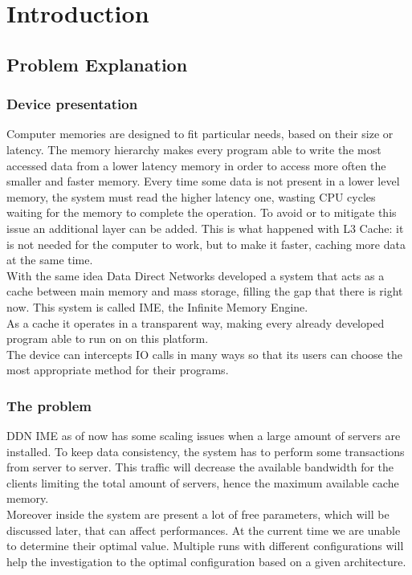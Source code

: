 \chapter{Introduction}

\section{Problem Explanation}
\subsection{Device presentation}
Computer memories are designed to fit particular needs, based on their size or
latency. The memory hierarchy makes every program able to write the most accessed
data from a lower latency memory in order to access more often the smaller and
faster memory. Every time some data is not present in a lower level
memory, the system must read the higher latency one, wasting CPU cycles waiting
for the memory to complete the operation. To avoid or to mitigate this issue an
additional layer can be added. This is what happened with L3 Cache: it is
not needed for the computer to work, but to make it faster, caching more data at
the same time. \\
With the same idea Data Direct Networks developed a system that acts as a cache
between main memory and mass storage, filling the gap that there is right now.
This system is called IME, the Infinite Memory Engine.
\\ As a cache it operates in a transparent way, making every already developed
program able to run on on this platform. \\ The device can intercepts IO calls in
many ways so that its users can choose the most appropriate method for their
programs.

\subsection{The problem}
DDN IME as of now has some scaling issues when a large amount of servers are
installed. To keep data consistency, the system has to perform some transactions
from server to server. This traffic will decrease the available bandwidth for
the clients limiting the total amount of servers, hence the maximum available
cache memory. \\
Moreover inside the system are present a lot of free parameters, which will be
discussed later, that can affect performances. At the current time we are
unable to determine their optimal value. Multiple runs with different
configurations will help the investigation to the optimal configuration based on
a given architecture.

